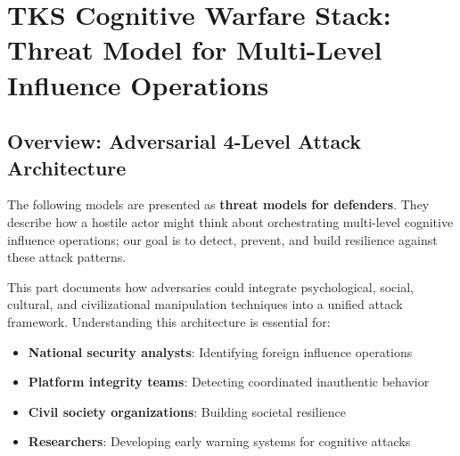 \documentclass[11pt,twoside]{book}
\theoremstyle{definition}
\theoremstyle{plain}
\theoremstyle{remark}
\begin{document}
\part{TKS Cognitive Warfare Stack: Threat Model for Multi-Level Influence Operations}
\label{part:cogwar}

\chapter{Overview: Adversarial 4-Level Attack Architecture}
\label{ch:cogwar-overview}

\begin{tcolorbox}[colback=red!5!white,colframe=red!75!black,title=\textbf{THREAT MODEL NOTICE},breakable]
The following models are presented as \textbf{threat models for defenders}. They describe how a hostile actor might think about orchestrating multi-level cognitive influence operations; our goal is to detect, prevent, and build resilience against these attack patterns.

This part documents how adversaries could integrate psychological, social, cultural, and civilizational manipulation techniques into a unified attack framework. Understanding this architecture is essential for:
\begin{itemize}
    \item \textbf{National security analysts}: Identifying foreign influence operations
    \item \textbf{Platform integrity teams}: Detecting coordinated inauthentic behavior
    \item \textbf{Civil society organizations}: Building societal resilience
    \item \textbf{Researchers}: Developing early warning systems for cognitive attacks
\end{itemize}
\end{tcolorbox}
\end{document}
